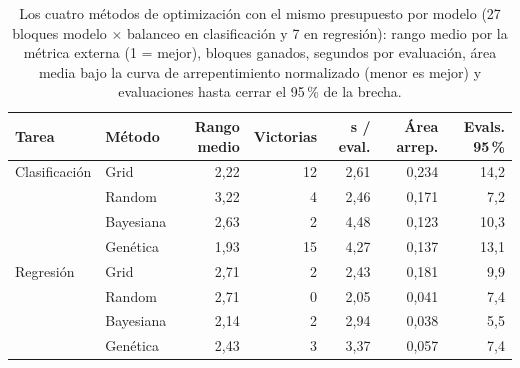 \begin{table}[htbp]
\caption{Los cuatro métodos de optimización con el mismo presupuesto por modelo (27 bloques modelo $\times$ balanceo en clasificación y 7 en regresión): rango medio por la métrica externa (1 = mejor), bloques ganados, segundos por evaluación, área media bajo la curva de arrepentimiento normalizado (menor es mejor) y evaluaciones hasta cerrar el 95\,\% de la brecha.}\label{tab:optimizadores}
\scriptsize\setlength{\tabcolsep}{2pt}
\begin{tabular}{llrrrrr}
\toprule
\textbf{Tarea} & \textbf{Método} & \textbf{Rango medio} & \textbf{Victorias} & \textbf{s / eval.} & \textbf{Área arrep.} & \textbf{Evals. 95\,\%} \\
\midrule
Clasificación & Grid & 2,22 & 12 & 2,61 & 0,234 & 14,2 \\
 & Random & 3,22 & 4 & 2,46 & 0,171 & 7,2 \\
 & Bayesiana & 2,63 & 2 & 4,48 & 0,123 & 10,3 \\
 & Genética & 1,93 & 15 & 4,27 & 0,137 & 13,1 \\
Regresión & Grid & 2,71 & 2 & 2,43 & 0,181 & 9,9 \\
 & Random & 2,71 & 0 & 2,05 & 0,041 & 7,4 \\
 & Bayesiana & 2,14 & 2 & 2,94 & 0,038 & 5,5 \\
 & Genética & 2,43 & 3 & 3,37 & 0,057 & 7,4 \\
\bottomrule
\end{tabular}
\end{table}
